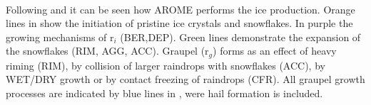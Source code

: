 \\
Following \cite{pinty_mixed-phased_1998} and  it can be seen how AROME performs the ice production. Orange lines in  show the initiation of pristine ice crystals and snowflakes. In purple the growing mechanisms of r$_i$ (BER,DEP). Green lines demonstrate the expansion of the snowflakes (RIM, AGG, ACC). Graupel (r$_g$) forms as an effect of heavy riming (RIM), by collision of larger raindrops with snowflakes (ACC), by WET/DRY growth or by contact freezing of raindrops (CFR). All graupel growth processes are indicated by blue lines in , were hail formation is included. 


%



%
